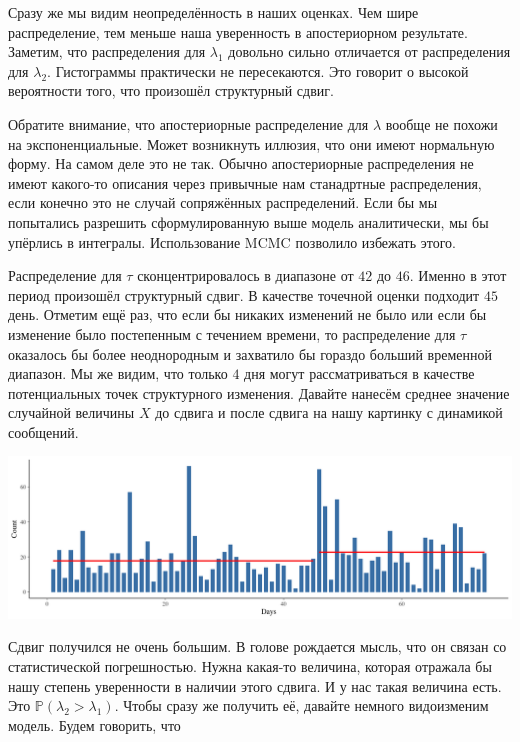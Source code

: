 \documentclass[12pt, a4paper, oneside]{extreport}
\def \mbb{\mathbb}
\def \PP{\mbb{P}}
\theoremstyle{plain}              %
\theoremstyle{definition}         %
\begin{document}
Сразу же мы видим неопределённость  в наших оценках. Чем шире распределение, тем меньше наша уверенность в апостериорном результате.  Заметим, что распределения для $\lambda_1$ довольно сильно отличается от распределения для $\lambda_2$. Гистограммы практически не пересекаются. Это говорит о высокой вероятности того, что произошёл структурный сдвиг. 

Обратите внимание, что апостериорные распределение для $\lambda$ вообще не похожи на экспоненциальные. Может возникнуть иллюзия, что они имеют нормальную форму. На самом деле это не так. Обычно апостериорные распределения не имеют какого-то описания через привычные нам станадртные распределения, если конечно это не случай сопряжённых распределений. Если бы мы попытались разрешить сформулированную выше модель аналитически, мы бы упёрлись в интегралы. Использование MCMC позволило избежать этого. 

Распределение для $\tau$ сконцентрировалось в диапазоне от $42$ до $46$. Именно в этот период произошёл структурный сдвиг. В качестве точечной оценки подходит $45$ день. Отметим ещё раз, что если бы никаких изменений не было или если бы изменение было постепенным с течением времени, то распределение для $\tau$ оказалось бы более неоднородным и захватило бы гораздо больший временной диапазон. Мы же видим, что только $4$ дня могут рассматриваться в качестве потенциальных точек структурного изменения.  Давайте нанесём среднее значение случайной величины $X$ до сдвига и после сдвига на нашу картинку с динамикой сообщений. 

\begin{center}
	\includegraphics[scale=0.35]{poisson_shift2.png}
\end{center} 

Сдвиг получился не очень большим. В голове рождается мысль, что он связан со статистической погрешностью. Нужна какая-то величина, которая отражала бы нашу степень уверенности в наличии этого сдвига. И у нас такая величина есть. Это $\PP(\lambda_2 > \lambda_1)$. Чтобы сразу же получить её, давайте немного видоизменим модель. Будем говорить, что 
\end{document}
